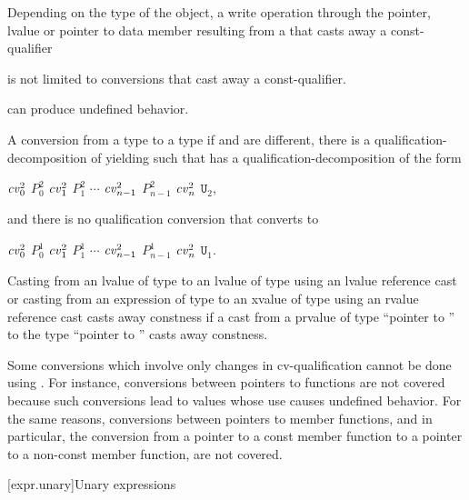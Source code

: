 \pnum
\begin{note}
Depending on the type of the object, a write operation through the
pointer, lvalue or pointer to data member resulting from a
 that casts away a const-qualifier
\begin{footnote}
is not limited to conversions that cast away a
const-qualifier.
\end{footnote}
can produce undefined behavior.
\end{note}

\pnum
{}%
A conversion from a type  to a type 
if  and  are different,
there is a qualification-decomposition of 
yielding  such that
 has a qualification-decomposition of the form
\begin{indented}
$\cv{}_0^2$ $P_0^2$ $\cv{}_1^2$ $P_1^2$ $\cdots$ $\cv{}_{n-1}^2$ $P_{n-1}^2$ $\cv{}_n^2$ $\mathtt{U}_2$,
\end{indented}
and there is no qualification conversion that converts  to
\begin{indented}
$\cv{}_0^2$ $P_0^1$ $\cv{}_1^2$ $P_1^1$ $\cdots$ $\cv{}_{n-1}^2$ $P_{n-1}^1$ $\cv{}_n^2$ $\mathtt{U}_1$.
\end{indented}

\pnum
Casting from an lvalue of type  to an lvalue of type
 using an lvalue reference cast
or casting from an expression of type  to an xvalue of type  using
an rvalue reference cast
casts away constness if a cast from a prvalue of type ``pointer to '' to the type ``pointer to
'' casts away constness.

\pnum
\begin{note}
Some conversions which involve only changes in cv-qualification cannot
be done using . For instance, conversions between
pointers to functions are not covered because such conversions lead to
values whose use causes undefined behavior. For the same reasons,
conversions between pointers to member functions, and in particular, the
conversion from a pointer to a const member function to a pointer to a
non-const member function, are not covered.
\end{note}

[expr.unary]{Unary expressions}

